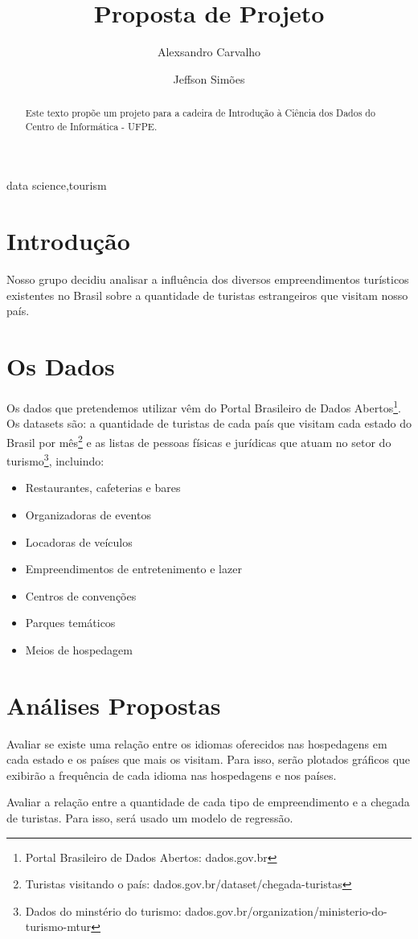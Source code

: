 \documentclass[review]{elsarticle}
\begin{document}
\begin{frontmatter}

\title{Proposta de Projeto}

\author{Alexsandro Carvalho}

\author{Jeffson Simões}

\begin{abstract}
Este texto propõe um projeto para a cadeira de Introdução à Ciência dos Dados do Centro de Informática - UFPE.
\end{abstract}

\begin{keyword}
data science\sep tourism
\end{keyword}

\end{frontmatter}

\linenumbers

\section{Introdução}
Nosso grupo decidiu analisar a influência dos diversos empreendimentos turísticos existentes no Brasil sobre a quantidade de turistas estrangeiros que visitam nosso país.

\section{Os Dados}
Os dados que pretendemos utilizar vêm do Portal Brasileiro de Dados Abertos\footnote{Portal Brasileiro de Dados Abertos: dados.gov.br}. Os datasets são: a quantidade de turistas de cada país que visitam cada estado do Brasil por mês\footnote{Turistas visitando o país: dados.gov.br/dataset/chegada-turistas} e as listas de pessoas físicas e jurídicas que atuam no setor do turismo\footnote{Dados do minstério do turismo: dados.gov.br/organization/ministerio-do-turismo-mtur}, incluindo:
\begin{itemize}
\item Restaurantes, cafeterias e bares
\item Organizadoras de eventos
\item Locadoras de veículos
\item Empreendimentos de entretenimento e lazer
\item Centros de convenções
\item Parques temáticos
\item Meios de hospedagem
\end{itemize}

\section{Análises Propostas}
Avaliar se existe uma relação entre os idiomas oferecidos nas hospedagens em cada estado e os países que mais os visitam. Para isso, serão plotados gráficos que exibirão a frequência de cada idioma nas hospedagens e nos países.

Avaliar a relação entre a quantidade de cada tipo de empreendimento e a chegada de turistas. Para isso, será usado um modelo de regressão.
\end{document}
